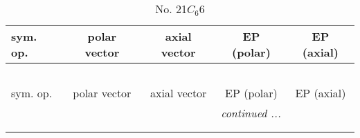 \documentclass[fleqn,10pt,landscape]{jsarticle}
\begin{document}
\newpage
\begin{center}
\renewcommand{\arraystretch}{1.3}
\begin{longtable}{lcccc}
\caption{No. 21\quad$C_{6}$\quad$6$\quad[ hexagonal ]}
 \\
 \hline \hline
sym. op. & polar vector & axial vector & EP (polar) & EP (axial) \\ \hline \endfirsthead

\multicolumn{4}{l}{\tablename\ \thetable{}} \\
 \hline \hline
sym. op. & polar vector & axial vector & EP (polar) & EP (axial) \\ \hline \endhead

 \hline \hline
\multicolumn{4}{r}{\footnotesize\it continued ...} \\ \endfoot

 \hline \hline
\multicolumn{4}{r}{} \\ \endlastfoot


\end{longtable}
\end{center}
\end{document}
